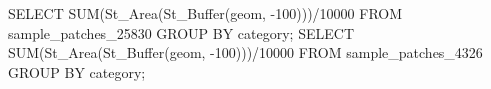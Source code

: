 \lstset{caption=Crear una función para calcular el IDW (I),label= IDW1}
\begin{SQL}
SELECT SUM(St_Area(St_Buffer(geom, -100)))/10000 FROM sample_patches_25830 GROUP BY category;
SELECT SUM(St_Area(St_Buffer(geom, -100)))/10000 FROM sample_patches_4326 GROUP BY category;
\end{SQL}
